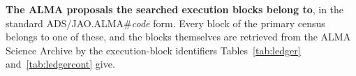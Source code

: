 \begin{table}
\centering
\scriptsize
\caption{\textbf{The \NProjCodes{} ALMA proposals the searched execution
blocks belong to}, in the standard
\mbox{ADS/JAO.ALMA\#\textit{code}} form. Every block of the primary census
belongs to one of these, and the blocks themselves are retrieved from the
ALMA Science Archive by the execution-block identifiers
Tables~\ref{tab:ledger} and~\ref{tab:ledgercont}
give.\ProjCodeUnresClause}
\label{tab:projcodes}

\end{table}
